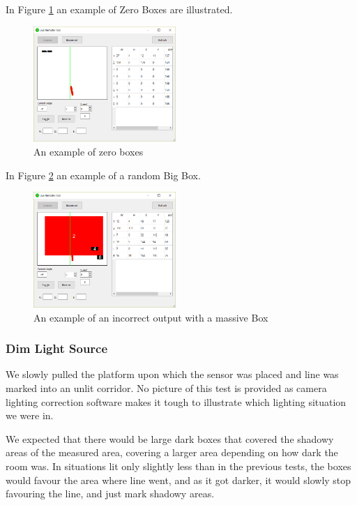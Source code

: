 In Figure \ref{fig:RemoteToolOutputZero} an example of Zero Boxes are illustrated.
\begin{figure}[H]
    \centering
    \includegraphics[width=0.48\textwidth]{Images/Analysis/NXTCamTesting/BusRemoteTool_ZeroBoxes3.png}
    \caption{An example of zero boxes}
    \label{fig:RemoteToolOutputZero}
\end{figure}



In Figure \ref{fig:RemoteToolMassive} an example of a random Big Box.
\begin{figure}[H]
    \centering
    \includegraphics[width=0.48\textwidth]{Images/Analysis/NXTCamTesting/BusRemoteTool_BigBox.png}
    \caption{An example of an incorrect output with a massive Box}
    \label{fig:RemoteToolMassive}
\end{figure}

\subsubsection{Dim Light Source}
We slowly pulled the platform upon which the sensor was placed and line was marked into an unlit corridor. No picture of this test is provided as camera lighting correction software makes it tough to illustrate which lighting situation we were in. 

We expected that there would be large dark boxes that covered the shadowy areas of the measured area, covering a larger area depending on how dark the room was. In situations lit only slightly less than in the previous tests, the boxes would favour the area where line went, and as it got darker, it would slowly stop favouring the line, and just mark shadowy areas.

